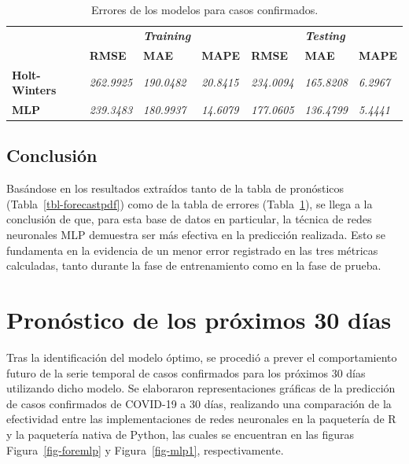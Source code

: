 \documentclass[
  us-letterpaper,
]{scrreprt}
\theoremstyle{plain}
\theoremstyle{definition}
\theoremstyle{definition}
\theoremstyle{plain}
\theoremstyle{remark}
\begin{document}
\begin{longtable}[]{@{}
  >{\raggedright\arraybackslash}p{}
  >{\centering\arraybackslash}p{}
  >{\centering\arraybackslash}p{}
  >{\centering\arraybackslash}p{}
  >{\centering\arraybackslash}p{}
  >{\centering\arraybackslash}p{}
  >{\centering\arraybackslash}p{}@{}}
\caption{Errores de los modelos para casos
confirmados.}\label{tbl-err}\tabularnewline
\toprule\noalign{}
\endfirsthead
\endhead
\bottomrule\noalign{}
\endlastfoot
& & \textbf{\emph{Training}} & & & \textbf{\emph{Testing}} & \\
& \textbf{RMSE} & \textbf{MAE} & \textbf{MAPE} & \textbf{RMSE} &
\textbf{MAE} & \textbf{MAPE} \\
\textbf{Holt-Winters} & \emph{262.9925} & \emph{190.0482} &
\emph{20.8415} & \emph{234.0094} & \emph{165.8208} & \emph{6.2967} \\
\textbf{MLP} & \emph{239.3483} & \emph{180.9937} & \emph{14.6079} &
\emph{177.0605} & \emph{136.4799} & \emph{5.4441} \\
\end{longtable}

\subsection{Conclusión}\label{conclusiuxf3n}

Basándose en los resultados extraídos tanto de la tabla de pronósticos
(Tabla~\ref{tbl-forecastpdf}) como de la tabla de errores
(Tabla~\ref{tbl-err}), se llega a la conclusión de que, para esta base
de datos en particular, la técnica de redes neuronales MLP demuestra ser
más efectiva en la predicción realizada. Esto se fundamenta en la
evidencia de un menor error registrado en las tres métricas calculadas,
tanto durante la fase de entrenamiento como en la fase de prueba.

\section{Pronóstico de los próximos 30
días}\label{pronuxf3stico-de-los-pruxf3ximos-30-duxedas}

Tras la identificación del modelo óptimo, se procedió a prever el
comportamiento futuro de la serie temporal de casos confirmados para los
próximos 30 días utilizando dicho modelo. Se elaboraron representaciones
gráficas de la predicción de casos confirmados de COVID-19 a 30 días,
realizando una comparación de la efectividad entre las implementaciones
de redes neuronales en la paquetería de R y la paquetería nativa de
Python, las cuales se encuentran en las figuras Figura~\ref{fig-foremlp}
y Figura~\ref{fig-mlp1}, respectivamente.
\end{document}

